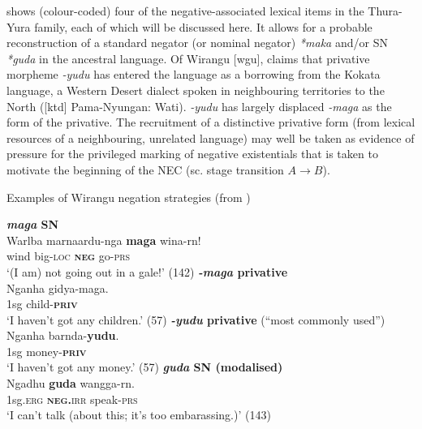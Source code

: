 \documentclass[output=paper,draft,draftmode,colorlinks,citecolor=brown]{langscibook}
\begin{document}
 shows (colour-coded) four of the
    negative-associated lexical items in the Thura-Yura family, each of
    which will be discussed here. It allows for a probable reconstruction
    of a standard negator (or nominal negator) \textit{*maka} and\slash or
    SN \textit{*guda} in the ancestral language. Of Wirangu
    [wgu], \citet[57]{Hercus1999} claims that privative morpheme
    \textit{-yudu} has entered the language as a borrowing from the
    Kokata language, a Western Desert dialect spoken in neighbouring territories to the North ([ktd] Pama-Nyungan: Wati). \textit{-yudu} has largely displaced \textit{-maga} as the form of the privative. The recruitment of a distinctive privative form (from lexical resources of a neighbouring, unrelated language) may well be taken as evidence of pressure for the privileged marking of negative existentials that is taken to motivate the beginning of the NEC (sc. stage transition $A\to B$).
%
{\begin{exe}\ex\label{ex:austr-negstrat-wirangu} Examples of Wirangu negation strategies (from \citealt{Hercus1999})
    \begin{xlist}
\ex \textbf{\emph{maga} SN}\\
\gll Warlba marnaardu-nga \textbf{maga} wina-rn!\\
wind big\textsc{-loc} \textsc{\textbf{neg}} go\textsc{-prs}\\
\glt  `(I am) not going out in a gale!'  (142)
%
\ex \textbf{\emph{-maga} privative}\\
\gll Nganha gidya-maga.\\
1sg child-\textsc{\textbf{priv}}\\
\glt `I haven't got any children.'  (57)
%
\ex
\textbf{ \emph{-yudu} privative }(``most commonly used'')\\
\gll Nganha barnda-\textbf{yudu}.\\
1sg money-\textsc{\textbf{priv}}\\
\glt `I haven't got any money.'  (57)
%
        \ex \textbf{\emph{guda} SN (modalised)}\\
\gll Ngadhu \textbf{guda} wangga-rn.\\
1sg.\textsc{erg} \textsc{\textbf{neg.}irr} speak\textsc{-prs}\\
        \glt `I can't talk (about this; it's too embarassing.)'
        (143)
    \end{xlist}\end{exe}}
\end{document}
